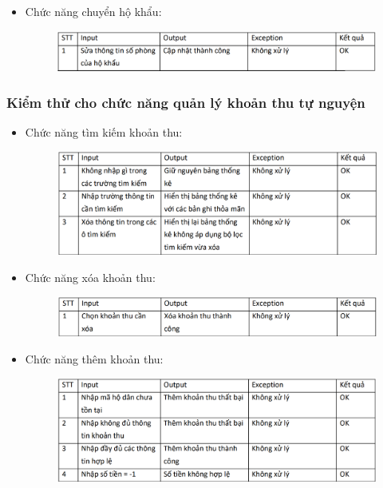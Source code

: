 \documentclass{article}
\begin{document}
\begin{itemize}
\begin{figure}[H]
    \end{figure}
    \item Chức năng chuyển hộ khẩu:
    \begin{figure}[H]
        \centering
        \includegraphics[width=1\textwidth]{Kiểm thử hộ khẩu/Screenshot 2024-12-14 002001.png}
    \end{figure}
\end{itemize}
\subsubsection{Kiểm thử cho chức năng quản lý khoản thu tự nguyện}
\begin{itemize}
    \item Chức năng tìm kiếm khoản thu:
    \begin{figure}[H]
        \centering
        \includegraphics[width=1\textwidth]{Kiểm thử phí tình nguyện/Screenshot 2024-12-14 002438.png}
    \end{figure}
    \vspace{2cm}
    \item Chức năng xóa khoản thu:
    \begin{figure}[H]
        \centering
        \includegraphics[width=1\textwidth]{Kiểm thử phí tình nguyện/Screenshot 2024-12-14 002443.png}
    \end{figure}
    \item Chức năng thêm khoản thu:
    \begin{figure}[H]
        \centering
        \includegraphics[width=1\textwidth]{Kiểm thử phí tình nguyện/Screenshot 2024-12-14 002453.png}
    \end{figure}
\end{itemize}
\end{document}
